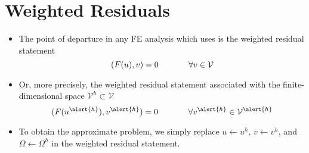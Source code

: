 \section{Weighted Residuals}
%

\begin{frame}[<+->]
  \begin{itemize}
  \item {The point of departure in any FE analysis which uses \libMesh{} is
    the weighted residual statement
    \begin{equation}
      \nonumber
      (F( u ), v) = 0 \hspace{.5in} \forall v \in \mathcal{V}
    \end{equation}
    }

  \item{ Or, more precisely, the weighted residual statement associated with the
    finite-dimensional space $\mathcal{V}^h \subset \mathcal{V}$
    \begin{equation}
      \nonumber
      (F( u^{\alert{h}} ), v^{\alert{h}}) = 0 \hspace{.5in} \forall v^{\alert{h}} \in \mathcal{V}^{\alert{h}}
  \end{equation}}

  \end{itemize}
\end{frame}





\begin{frame}%
  \begin{itemize}




  \item{To obtain the approximate problem, we simply
    replace $u \leftarrow u^h$, $v \leftarrow v^h$, and $\Omega \leftarrow \Omega^h$
    in the weighted residual
    statement.}
    
  \end{itemize}
\end{frame}

